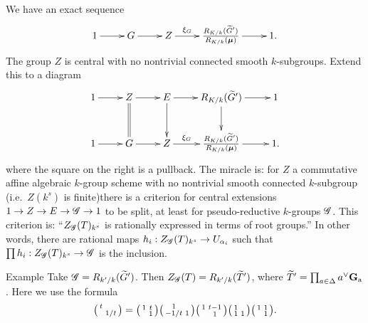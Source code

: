 We have an exact sequence 
\[\xymatrix{
  1 \ar[r] 
    & G \ar[r] 
    & Z \ar[r]^-{\xi_G} 
    & \frac{R_{K/k}(\widetilde G')}{R_{K/k}(\boldsymbol\mu)} \ar[r] 
    & 1 .
}\]
The group $Z$ is central with no nontrivial connected smooth $k$-subgroups. 
Extend this to a diagram 
\[\xymatrix{
  1 \ar[r] 
    & Z \ar[r] \ar@{=}[d] 
    & E \ar[r] \ar[d] 
    & R_{K/k}(\widetilde G') \ar[r] \ar[d] 
    & 1 \\
  1 \ar[r] 
    & G \ar[r] 
    & Z \ar[r]^-{\xi_G} 
    & \frac{R_{K/k}(\widetilde G')}{R_{K/k}(\boldsymbol\mu)} \ar[r] 
    & 1 .
}\]
where the square on the right is a pullback. The miracle is: for $Z$ a 
commutative affine algebraic $k$-group scheme with no nontrivial smooth 
connected $k$-subgroup (i.e.\ $Z(k^s)$ is finite)there is a criterion for 
central extensions $1 \to Z \to E \to \mathscr{G} \to 1$ to be split, at least for 
pseudo-reductive $k$-groups $\mathscr{G}$. This criterion is: ``$Z_{\mathscr{G}}(T)_{k^s}$ is 
rationally expressed in terms of root groups.'' In other words, there are 
rational maps $h_i:Z_{\mathscr{G}}(T)_{k^s} \to U_{\alpha_i}$ such that 
$\prod h_i:Z_{\mathscr{G}}(T)_{k^s} \to \mathscr{G}$ is the inclusion. 

\begin{enonce}[remark]{Example}
Take $\mathscr{G}=R_{k'/k}(\widetilde G')$. Then $Z_{\mathscr{G}}(T)=R_{k'/k}(\widetilde T')$, 
where $\widetilde T'=\prod_{a\in \Delta}a^\vee \mathbf{G}_{\mathrm{a}}$. Here we use the 
formula 
\[
  \bigl(\begin{smallmatrix} t &  \\  & 1/t \end{smallmatrix} \bigr) = \bigl(\begin{smallmatrix} 1 & t \\  & 1 \end{smallmatrix} \bigr) \bigl(\begin{smallmatrix} 1 &  \\ -1/t & 1 \end{smallmatrix} \bigr) \bigl(\begin{smallmatrix} 1 & t-1 \\  & 1 \end{smallmatrix} \bigr) \bigl(\begin{smallmatrix} 1 &  \\ 1 & 1 \end{smallmatrix} \bigr) \bigl(\begin{smallmatrix} 1 & 1 \\  & 1 \end{smallmatrix} \bigr) .
\]
\end{enonce}



